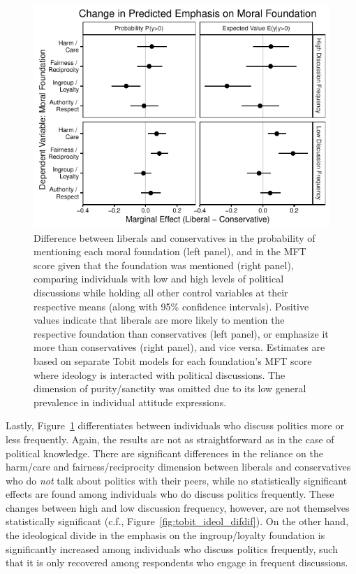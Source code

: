 \documentclass[12pt]{article}
\begin{document}
\begin{figure}[ht]\centering
\includegraphics{../calc/fig/tobit_ideol_disc.pdf}
\caption{Difference between liberals and conservatives in the probability of mentioning each moral foundation (left panel), and in the MFT score given that the foundation was mentioned (right panel), comparing individuals with low and high levels of political discussions while holding all other control variables at their respective means (along with 95\% confidence intervals). Positive values indicate that liberals are more likely to mention the respective foundation than conservatives (left panel), or emphasize it more than conservatives (right panel), and vice versa. Estimates are based on separate Tobit models for each foundation's MFT score where ideology is interacted with political discussions. The dimension of purity/sanctity was omitted due to its low general prevalence in individual attitude expressions.}\label{fig:tobit_ideol_disc}
\end{figure}

Lastly, Figure~\ref{fig:tobit_ideol_disc} differentiates between individuals who discuss politics more or less frequently. Again, the results are not as straightforward as in the case of political knowledge. There are significant differences in the reliance on the harm/care and fairness/reciprocity dimension between liberals and conservatives who do \textit{not} talk about politics with their peers, while no statistically significant effects are found among individuals who do discuss politics frequently. These changes between high and low discussion frequency, however, are not themselves statistically significant (c.f., Figure~\ref{fig:tobit_ideol_difdif}). On the other hand, the ideological divide in the emphasis on the ingroup/loyalty foundation is significantly increased among individuals who discuss politics frequently, such that it is only recovered among respondents who engage in frequent discussions.
\end{document}
